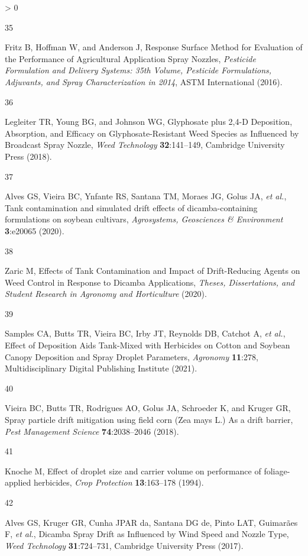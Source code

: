 \documentclass[
  12pt,
  a4paper,
]{article}
\newlength{\cslhangindent}
\newlength{\csllabelwidth}
\newenvironment{CSLReferences}[2] %
 {%
  \setlength{\parindent}{0pt}
  \ifodd #1 \everypar{\setlength{\hangindent}{\cslhangindent}}\ignorespaces\fi
  \ifnum #2 > 0
  \setlength{\parskip}{#2\baselineskip}
  \fi
 }%
 {}
\newcommand{\CSLLeftMargin}[1]{\parbox[t]{\csllabelwidth}{#1}}
\newcommand{\CSLRightInline}[1]{\parbox[t]{\linewidth - \csllabelwidth}{#1}\break}
\begin{document}
\begin{CSLReferences}{1}{0}
\leavevmode\hypertarget{ref-fritz2016}{}%
\CSLLeftMargin{35 }
\CSLRightInline{Fritz B, Hoffman W, and Anderson J, Response {Surface
Method} for {Evaluation} of the {Performance} of {Agricultural
Application Spray Nozzles}, \emph{Pesticide Formulation and Delivery
Systems: 35th Volume, Pesticide Formulations, Adjuvants, and Spray
Characterization in 2014}, {ASTM International} (2016).}

\leavevmode\hypertarget{ref-legleiter2018}{}%
\CSLLeftMargin{36 }
\CSLRightInline{Legleiter TR, Young BG, and Johnson WG, Glyphosate plus
2,4-{D Deposition}, {Absorption}, and {Efficacy} on
{Glyphosate}-{Resistant Weed Species} as {Influenced} by {Broadcast
Spray Nozzle}, \emph{Weed Technology} \textbf{32}:141--149, {Cambridge
University Press} (2018).}

\leavevmode\hypertarget{ref-alves2020}{}%
\CSLLeftMargin{37 }
\CSLRightInline{Alves GS, Vieira BC, Ynfante RS, Santana TM, Moraes JG,
Golus JA, \emph{et al.}, Tank contamination and simulated drift effects
of dicamba-containing formulations on soybean cultivars,
\emph{Agrosystems, Geosciences \& Environment} \textbf{3}:e20065
(2020).}

\leavevmode\hypertarget{ref-zaric2020}{}%
\CSLLeftMargin{38 }
\CSLRightInline{Zaric M, Effects of {Tank Contamination} and {Impact} of
{Drift}-{Reducing Agents} on {Weed Control} in {Response} to {Dicamba
Applications}, \emph{Theses, Dissertations, and Student Research in
Agronomy and Horticulture} (2020).}

\leavevmode\hypertarget{ref-samples2021}{}%
\CSLLeftMargin{39 }
\CSLRightInline{Samples CA, Butts TR, Vieira BC, Irby JT, Reynolds DB,
Catchot A, \emph{et al.}, Effect of {Deposition Aids Tank}-{Mixed} with
{Herbicides} on {Cotton} and {Soybean Canopy Deposition} and {Spray
Droplet Parameters}, \emph{Agronomy} \textbf{11}:278, {Multidisciplinary
Digital Publishing Institute} (2021).}

\leavevmode\hypertarget{ref-vieira2018}{}%
\CSLLeftMargin{40 }
\CSLRightInline{Vieira BC, Butts TR, Rodrigues AO, Golus JA, Schroeder
K, and Kruger GR, Spray particle drift mitigation using field corn
({Zea} mays {L}.) As a drift barrier, \emph{Pest Management Science}
\textbf{74}:2038--2046 (2018).}

\leavevmode\hypertarget{ref-knoche1994}{}%
\CSLLeftMargin{41 }
\CSLRightInline{Knoche M, Effect of droplet size and carrier volume on
performance of foliage-applied herbicides, \emph{Crop Protection}
\textbf{13}:163--178 (1994).}

\leavevmode\hypertarget{ref-alves2017}{}%
\CSLLeftMargin{42 }
\CSLRightInline{Alves GS, Kruger GR, Cunha JPAR da, Santana DG de, Pinto
LAT, Guimarães F, \emph{et al.}, Dicamba {Spray Drift} as {Influenced}
by {Wind Speed} and {Nozzle Type}, \emph{Weed Technology}
\textbf{31}:724--731, {Cambridge University Press} (2017).}


\end{CSLReferences}
\end{document}
